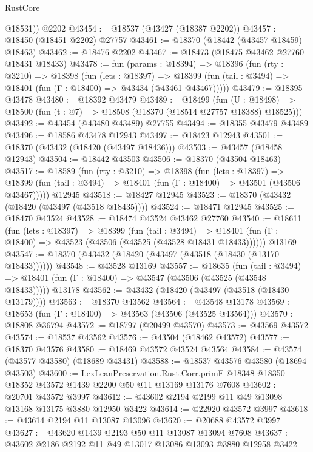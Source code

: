 \begin{lexlean}{RustCore}
\begin{coremodule}
        @18531))
    @2202
@43454 := @18537 (@43427 (@18387 @2202))
@43457 := @18450 (@18451 @2202) @27757
@43461 := @18370 (@18442 (@43457 @18459) @18463)
@43462 := @18476 @2202
@43467 := @18473 (@18475 @43462 @27760 @18431 @18433)
@43478 := fun (params : @18394) =>
  @18396
    (fun (rty : @3210) =>
    @18398
      (fun (lets : @18397) =>
      @18399 (fun (tail : @3494) => @18401 (fun (Γ : @18400) => @43434 (@43461 @43467)))))
@43479 := @18395 @43478
@43480 := @18392 @43479
@43489 := @18499
    (fun (U : @18498) => @18500 (fun (t : @7) => @18508 (@18370 (@18514 @27757 @18388) @18525)))
@43492 := @43454 (@43480 @43489) @27755
@43494 := @18355 @43479 @43489
@43496 := @18586 @43478 @12943
@43497 := @18423 @12943
@43501 := @18370 (@43432 (@18420 (@43497 @18436)))
@43503 := @43457 (@18458 @12943)
@43504 := @18442 @43503
@43506 := @18370 (@43504 @18463)
@43517 := @18589
    (fun (rty : @3210) =>
    @18398
      (fun (lets : @18397) =>
      @18399 (fun (tail : @3494) => @18401 (fun (Γ : @18400) => @43501 (@43506 @43467)))))
    @12945
@43518 := @18427 @12945
@43523 := @18370 (@43432 (@18420 (@43497 (@43518 @18435))))
@43524 := @18471 @12945
@43525 := @18470 @43524
@43528 := @18474 @43524 @43462 @27760
@43540 := @18611
    (fun (lets : @18397) =>
    @18399
      (fun (tail : @3494) =>
      @18401 (fun (Γ : @18400) => @43523 (@43506 (@43525 (@43528 @18431 @18433))))))
    @13169
@43547 := @18370 (@43432 (@18420 (@43497 (@43518 (@18430 (@13170 @18433))))))
@43548 := @43528 @13169
@43557 := @18635
    (fun (tail : @3494) => @18401 (fun (Γ : @18400) => @43547 (@43506 (@43525 (@43548 @18433)))))
    @13178
@43562 := @43432 (@18420 (@43497 (@43518 (@18430 @13179))))
@43563 := @18370 @43562
@43564 := @43548 @13178
@43569 := @18653 (fun (Γ : @18400) => @43563 (@43506 (@43525 @43564)))
@43570 := @18808 @36794
@43572 := @18797 (@20499 @43570)
@43573 := @43569 @43572
@43574 := @18537 @43562
@43576 := @43504 (@18462 @43572)
@43577 := @18370 @43576
@43580 := @18469 @43572 @43524 @43564
@43584 := @43574 (@43577 @43580) (@18689 @43431)
@43588 := @18537 @43576 @43580 (@18694 @43503)
@43600 := LexLeanPreservation.Rust.Corr.primF
    @18348
    @18350
    @18352
    @43572
    @1439
    @2200
    @50
    @11
    @13169
    @13176
    @7608
@43602 := @20701 @43572 @3997
@43612 := @43602 @2194 @2199 @11 @49 @13098 @13168 @13175 @3880 @12950 @3422
@43614 := @22920 @43572 @3997
@43618 := @43614 @2194 @11 @13087 @13096
@43620 := @20688 @43572 @3997
@43627 := @43620 @1439 @2193 @50 @11 @13087 @13094 @7608
@43637 := @43602 @2186 @2192 @11 @49 @13017 @13086 @13093 @3880 @12958 @3422

\end{coremodule}
\end{lexlean}
